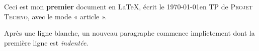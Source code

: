 \documentclass[a4paper]{article}
\begin{document}
Ceci est mon \textbf{premier} document en \LaTeX, écrit le \today en TP de
\textsc{Projet Techno}, avec le mode « article ».

Après une ligne blanche, un nouveau paragraphe commence implictement dont la
première ligne est \emph{indentée}.
\end{document}
